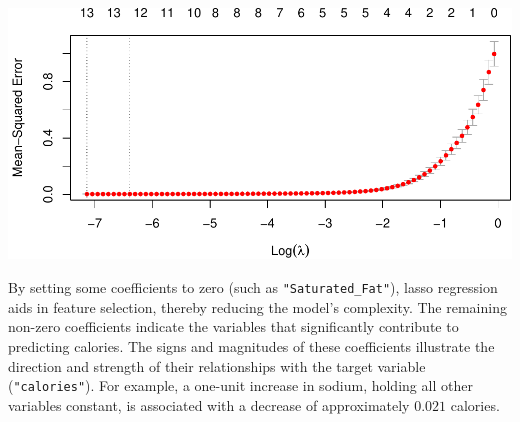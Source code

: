 \documentclass[
]{article}
\newenvironment{Shaded}{\begin{snugshade}}{\end{snugshade}}
\newcommand{\AttributeTok}[1]{\textcolor[rgb]{0.13,0.29,0.53}{#1}}
\newcommand{\CommentTok}[1]{\textcolor[rgb]{0.56,0.35,0.01}{\textit{#1}}}
\newcommand{\ConstantTok}[1]{\textcolor[rgb]{0.56,0.35,0.01}{#1}}
\newcommand{\DecValTok}[1]{\textcolor[rgb]{0.00,0.00,0.81}{#1}}
\newcommand{\FunctionTok}[1]{\textcolor[rgb]{0.13,0.29,0.53}{\textbf{#1}}}
\newcommand{\NormalTok}[1]{#1}
\newcommand{\OtherTok}[1]{\textcolor[rgb]{0.56,0.35,0.01}{#1}}
\newcommand{\SpecialCharTok}[1]{\textcolor[rgb]{0.81,0.36,0.00}{\textbf{#1}}}
\newcommand{\StringTok}[1]{\textcolor[rgb]{0.31,0.60,0.02}{#1}}
\begin{document}
\begin{Shaded}
\end{Shaded}

\begin{center}\includegraphics{Statistical_Learning_Final_Report_files/figure-latex/lasso_regression-1} \end{center}

By setting some coefficients to zero (such as
\texttt{"Saturated\_Fat"}), lasso regression aids in feature selection,
thereby reducing the model's complexity. The remaining non-zero
coefficients indicate the variables that significantly contribute to
predicting calories. The signs and magnitudes of these coefficients
illustrate the direction and strength of their relationships with the
target variable (\texttt{"calories"}). For example, a one-unit increase
in sodium, holding all other variables constant, is associated with a
decrease of approximately \(0.021\) calories.
\end{document}
